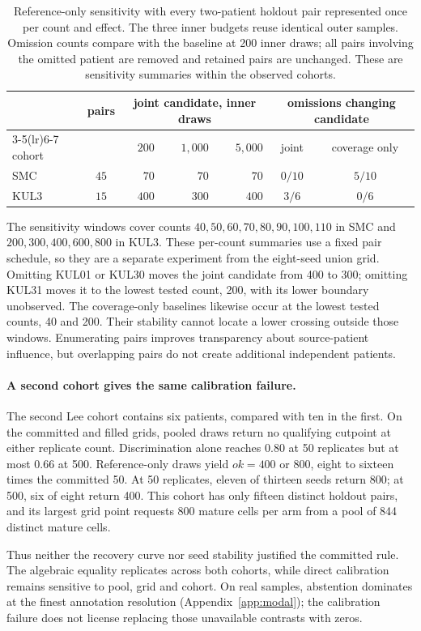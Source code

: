 \begin{table}[htbp]
\centering\small
\caption{Reference-only sensitivity with every two-patient holdout pair
represented once per count and effect. The three inner budgets reuse identical
outer samples. Omission counts compare with the baseline at 200 inner draws;
all pairs involving the omitted patient are removed and retained pairs are
unchanged. These are sensitivity summaries within the observed cohorts.}
\label{tab:sensitivity}
\begin{tabular}{@{}lcrrrcc@{}}
\toprule
 & pairs & \multicolumn{3}{c}{joint candidate, inner draws} &
 \multicolumn{2}{c}{omissions changing candidate} \\
\cmidrule(lr){3-5}\cmidrule(lr){6-7}
cohort & & $200$ & $1{,}000$ & $5{,}000$ & joint & coverage only \\
\midrule
SMC & $45$ & $70$ & $70$ & $70$ & $0/10$ & $5/10$ \\
KUL3 & $15$ & $400$ & $300$ & $400$ & $3/6$ & $0/6$ \\
\bottomrule
\end{tabular}
\end{table}

The sensitivity windows cover counts $40,50,60,70,80,90,100,110$ in SMC and
$200,300,400,600,800$ in KUL3. These per-count summaries use a fixed pair
schedule, so they are a separate experiment from the eight-seed union grid.
Omitting KUL01 or KUL30 moves the joint candidate from 400 to 300; omitting
KUL31 moves it to the lowest tested count, 200, with its lower boundary
unobserved. The coverage-only baselines likewise occur at the lowest tested
counts, 40 and 200. Their stability cannot locate a lower crossing outside
those windows. Enumerating pairs improves transparency about source-patient
influence, but overlapping pairs do not create additional independent patients.

\paragraph{A second cohort gives the same calibration failure.}
The second Lee cohort contains six patients, compared with ten in the first.
On the committed and filled grids, pooled draws return no qualifying cutpoint
at either replicate count. Discrimination alone reaches $0.80$ at 50
replicates but at most $0.66$ at 500. Reference-only draws yield $ok=400$ or
800, eight to sixteen times the committed 50. At 50 replicates, eleven of
thirteen seeds return 800; at 500, six of eight return 400. This cohort has
only fifteen distinct holdout pairs, and its largest grid point requests 800
mature cells per arm from a pool of 844 distinct mature cells.

Thus neither the recovery curve nor seed stability justified the committed
rule. The algebraic equality replicates across both cohorts, while direct
calibration remains sensitive to pool, grid and cohort. On real samples,
abstention dominates at the finest annotation resolution
(Appendix~\ref{app:modal}); the calibration failure does not license replacing
those unavailable contrasts with zeros.
